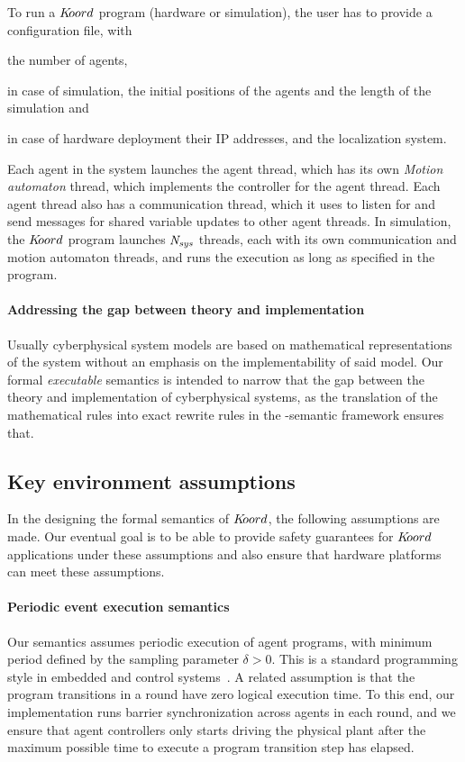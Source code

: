 To run a $K\kern-2pt oord$ program (hardware or simulation), the user has to provide a configuration file, with 
\begin{inparaenum}
\item the number of agents, 
\item in case of simulation, the initial positions of the agents and the length of the simulation and 
\item in case of hardware deployment their IP addresses, 
and the localization system.
\end{inparaenum} 
Each agent in the system launches the agent thread, which has its own \emph{Motion automaton} thread, which implements the controller for the agent thread. Each agent thread also has a communication thread, which it uses to listen for and send messages for shared variable updates to other agent threads. In simulation, the $K\kern-2pt oord$ program launches $\mathit{N_{sys}}$ threads, each with its own communication and motion automaton threads, and runs the execution as long as specified in the program.


\paragraph{Addressing the gap between theory and implementation}

Usually cyberphysical system models are based on mathematical representations of the system without an emphasis on the implementability of said model. Our formal \emph{executable} semantics is intended to narrow that the gap between the theory and implementation of cyberphysical systems, as the translation of the mathematical rules into exact rewrite rules in the \K-semantic framework ensures that.


\subsection{Key environment assumptions} 
In the designing the formal semantics of $K\kern-2pt oord$, the following assumptions are made. Our eventual goal is to be able to  provide safety guarantees for $K\kern-2pt oord$ applications under these assumptions and also ensure that hardware platforms can meet these assumptions. 


\paragraph*{Periodic event execution semantics}
 Our semantics assumes periodic execution of agent programs, with minimum period defined by the sampling parameter $\delta>0$. This is a standard programming style in embedded and control systems~\cite{henzinger2003giotto}.  A related assumption is that the program transitions in a round have  zero logical execution time. To this end, our implementation runs barrier synchronization across agents in each round, and we ensure that agent controllers only starts driving the physical plant after the maximum possible time to execute a program transition step has elapsed. 


